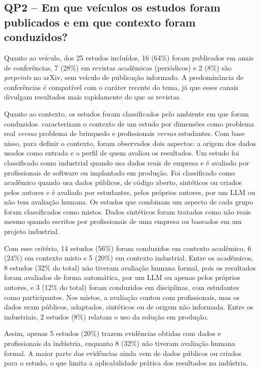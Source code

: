 \subsection{QP2 -- Em que veículos os estudos foram publicados e em que contexto foram conduzidos?}
\label{sec:qp2}

Quanto ao veículo, dos 25 estudos incluídos, 16 (64\%) foram publicados em anais de conferências, 7 (28\%) em revistas acadêmicas (periódicos) e 2 (8\%) são \textit{preprints} no arXiv, sem veículo de publicação informado. A predominância de conferências é compatível com o caráter recente do tema, já que esses canais divulgam resultados mais rapidamente do que as revistas.

Quanto ao contexto, os estudos foram classificados pelo ambiente em que foram conduzidos.  caracterizam o contexto de um estudo por dimensões como problema real \textit{versus} problema de brinquedo e profissionais \textit{versus} estudantes. Com base nisso, para definir o contexto, foram observados dois aspectos: a origem dos dados usados como entrada e o perfil de quem avaliou os resultados. Um estudo foi classificado como industrial quando usa dados reais de empresa e é avaliado por profissionais de software ou implantado em produção. Foi classificado como acadêmico quando usa dados públicos, de código aberto, sintéticos ou criados pelos autores e é avaliado por estudantes, pelos próprios autores, por um LLM ou não tem avaliação humana. Os estudos que combinam um aspecto de cada grupo foram classificados como mistos. Dados sintéticos foram tratados como não reais mesmo quando escritos por profissionais de uma empresa ou baseados em um projeto industrial.

Com esse critério, 14 estudos (56\%) foram conduzidos em contexto acadêmico, 6 (24\%) em contexto misto e 5 (20\%) em contexto industrial. Entre os acadêmicos, 8 estudos (32\% do total) não tiveram avaliação humana formal, pois os resultados foram avaliados de forma automática, por um LLM ou apenas pelos próprios autores, e 3 (12\% do total) foram conduzidos em disciplinas, com estudantes como participantes. Nos mistos, a avaliação contou com profissionais, mas os dados eram públicos, adaptados, sintéticos ou de origem não informada. Entre os industriais, 2 estudos (8\%) relatam o uso da solução em produção.

Assim, apenas 5 estudos (20\%) trazem evidências obtidas com dados e profissionais da indústria, enquanto 8 (32\%) não tiveram avaliação humana formal. A maior parte das evidências ainda vem de dados públicos ou criados para o estudo, o que limita a aplicabilidade prática dos resultados na indústria.

